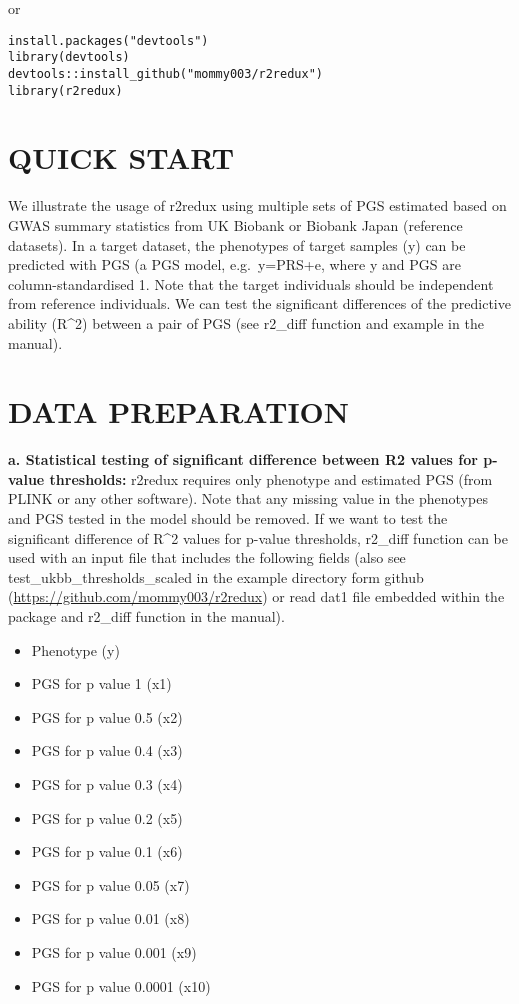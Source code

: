 \documentclass[
]{article}
\providecommand{\tightlist}{%
  \setlength{\itemsep}{0pt}\setlength{\parskip}{0pt}}
\begin{document}
or

\begin{verbatim}
install.packages("devtools")
library(devtools)
devtools::install_github("mommy003/r2redux")
library(r2redux)
\end{verbatim}

\hypertarget{quick-start}{%
\section{QUICK START}\label{quick-start}}

We illustrate the usage of r2redux using multiple sets of PGS estimated
based on GWAS summary statistics from UK Biobank or Biobank Japan
(reference datasets). In a target dataset, the phenotypes of target
samples (y) can be predicted with PGS (a PGS model, e.g.~y=PRS+e, where
y and PGS are column-standardised 1. Note that the target individuals
should be independent from reference individuals. We can test the
significant differences of the predictive ability (R\^{}2) between a
pair of PGS (see r2\_diff function and example in the manual).

\hypertarget{data-preparation}{%
\section{DATA PREPARATION}\label{data-preparation}}

\textbf{a. Statistical testing of significant difference between R2
values for p-value thresholds:} r2redux requires only phenotype and
estimated PGS (from PLINK or any other software). Note that any missing
value in the phenotypes and PGS tested in the model should be removed.
If we want to test the significant difference of R\^{}2 values for
p-value thresholds, r2\_diff function can be used with an input file
that includes the following fields (also see
test\_ukbb\_thresholds\_scaled in the example directory form github
(\url{https://github.com/mommy003/r2redux}) or read dat1 file embedded
within the package and r2\_diff function in the manual).

\begin{itemize}
\tightlist
\item
  Phenotype (y)
\item
  PGS for p value 1 (x1)
\item
  PGS for p value 0.5 (x2)
\item
  PGS for p value 0.4 (x3)
\item
  PGS for p value 0.3 (x4)
\item
  PGS for p value 0.2 (x5)
\item
  PGS for p value 0.1 (x6)
\item
  PGS for p value 0.05 (x7)
\item
  PGS for p value 0.01 (x8)
\item
  PGS for p value 0.001 (x9)
\item
  PGS for p value 0.0001 (x10)
\end{itemize}
\end{document}
